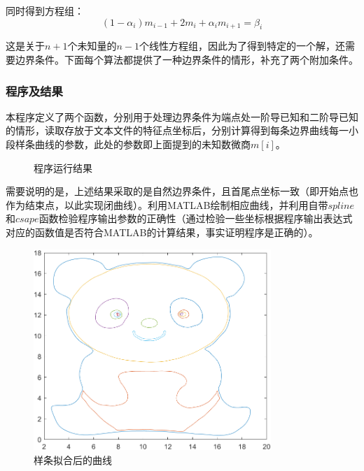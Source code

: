 \documentclass{article}
\begin{document}
	同时得到方程组：
	$$
	(1-\alpha_i)m_{i-1}+2m_i+\alpha_im_{i+1}=\beta_i
	$$
	
	这是关于$n+1$个未知量的$n-1$个线性方程组，因此为了得到特定的一个解，还需要边界条件。下面每个算法都提供了一种边界条件的情形，补充了两个附加条件。
	
	\newpage
	\subsubsection{程序及结果}
	本程序定义了两个函数，分别用于处理边界条件为端点处一阶导已知和二阶导已知的情形，读取存放于文本文件的特征点坐标后，分别计算得到每条边界曲线每一小段样条曲线的参数，此处的参数即上面提到的未知数微商$m[i]$。
	
	\begin{figure}[!h]
		\centering
		\caption{程序运行结果}
	\end{figure}
	
	需要说明的是，上述结果采取的是自然边界条件，且首尾点坐标一致（即开始点也作为结束点，以此实现闭曲线）。利用MATLAB绘制相应曲线，并利用自带$spline$和$csape$函数检验程序输出参数的正确性（通过检验一些坐标根据程序输出表达式对应的函数值是否符合MATLAB的计算结果，事实证明程序是正确的）。
	\begin{figure}[h]
		\centering
		\includegraphics[width=0.8\textwidth]{plotcubic.png}
		\caption{样条拟合后的曲线}
	\end{figure}
	
\end{document}
